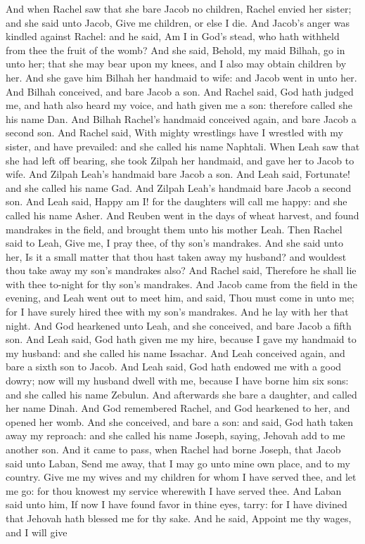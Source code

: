 And when Rachel saw that she bare Jacob no children, Rachel envied her sister; and she said unto Jacob, Give me children, or else I die. And Jacob’s anger was kindled against Rachel: and he said, Am I in God’s stead, who hath withheld from thee the fruit of the womb? And she said, Behold, my maid Bilhah, go in unto her; that she may bear upon my knees, and I also may obtain children by her. And she gave him Bilhah her handmaid to wife: and Jacob went in unto her. And Bilhah conceived, and bare Jacob a son. And Rachel said, God hath judged me, and hath also heard my voice, and hath given me a son: therefore called she his name Dan. And Bilhah Rachel’s handmaid conceived again, and bare Jacob a second son. And Rachel said, With mighty wrestlings have I wrestled with my sister, and have prevailed: and she called his name Naphtali.  When Leah saw that she had left off bearing, she took Zilpah her handmaid, and gave her to Jacob to wife. And Zilpah Leah’s handmaid bare Jacob a son. And Leah said, Fortunate! and she called his name Gad. And Zilpah Leah’s handmaid bare Jacob a second son. And Leah said, Happy am I! for the daughters will call me happy: and she called his name Asher.  And Reuben went in the days of wheat harvest, and found mandrakes in the field, and brought them unto his mother Leah. Then Rachel said to Leah, Give me, I pray thee, of thy son’s mandrakes. And she said unto her, Is it a small matter that thou hast taken away my husband? and wouldest thou take away my son’s mandrakes also? And Rachel said, Therefore he shall lie with thee to-night for thy son’s mandrakes. And Jacob came from the field in the evening, and Leah went out to meet him, and said, Thou must come in unto me; for I have surely hired thee with my son’s mandrakes. And he lay with her that night. And God hearkened unto Leah, and she conceived, and bare Jacob a fifth son. And Leah said, God hath given me my hire, because I gave my handmaid to my husband: and she called his name Issachar. And Leah conceived again, and bare a sixth son to Jacob. And Leah said, God hath endowed me with a good dowry; now will my husband dwell with me, because I have borne him six sons: and she called his name Zebulun. And afterwards she bare a daughter, and called her name Dinah. And God remembered Rachel, and God hearkened to her, and opened her womb. And she conceived, and bare a son: and said, God hath taken away my reproach: and she called his name Joseph, saying, Jehovah add to me another son.  And it came to pass, when Rachel had borne Joseph, that Jacob said unto Laban, Send me away, that I may go unto mine own place, and to my country. Give me my wives and my children for whom I have served thee, and let me go: for thou knowest my service wherewith I have served thee. And Laban said unto him, If now I have found favor in thine eyes, tarry: for I have divined that Jehovah hath blessed me for thy sake. And he said, Appoint me thy wages, and I will give 